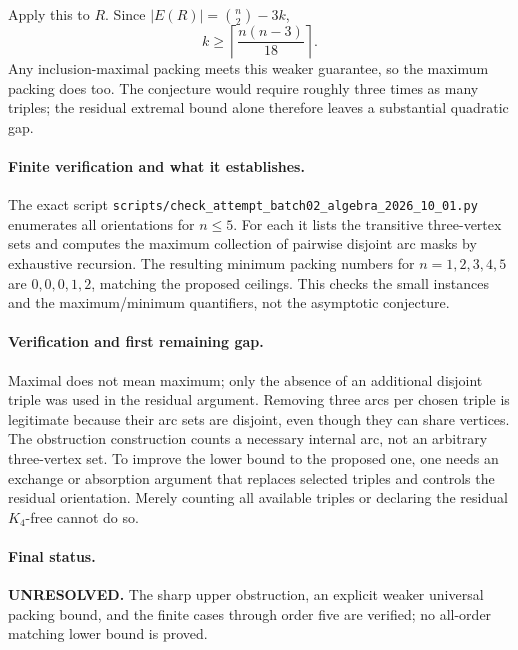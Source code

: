 \documentclass[11pt,a4paper]{article}
\begin{document}
Apply this to $R$. Since $|E(R)|=\binom n2-3k$,
\[
 k\ge\left\lceil\frac{n(n-3)}{18}\right\rceil.
\]
Any inclusion-maximal packing meets this weaker guarantee, so the
maximum packing does too. The conjecture would require roughly
three times as many triples; the residual extremal bound alone
therefore leaves a substantial quadratic gap.

\paragraph{Finite verification and what it establishes.}
The exact script
\texttt{scripts/check\_attempt\_batch02\_algebra\_2026\_10\_01.py}
enumerates all orientations for $n\le5$. For each it lists the
transitive three-vertex sets and computes the maximum collection of
pairwise disjoint arc masks by exhaustive recursion. The resulting
minimum packing numbers for $n=1,2,3,4,5$ are $0,0,0,1,2$,
matching the proposed ceilings. This checks the small instances
and the maximum/minimum quantifiers, not the asymptotic conjecture.

\paragraph{Verification and first remaining gap.}
Maximal does not mean maximum; only the absence of an additional
disjoint triple was used in the residual argument. Removing three
arcs per chosen triple is legitimate because their arc sets are
disjoint, even though they can share vertices. The obstruction
construction counts a necessary internal arc, not an arbitrary
three-vertex set. To improve the lower bound to the proposed one,
one needs an exchange or absorption argument that replaces selected
triples and controls the residual orientation. Merely counting all
available triples or declaring the residual $K_4$-free cannot do so.

\paragraph{Final status.}
\textbf{UNRESOLVED.} The sharp upper obstruction, an explicit weaker
universal packing bound, and the finite cases through order five
are verified; no all-order matching lower bound is proved.
\end{document}
